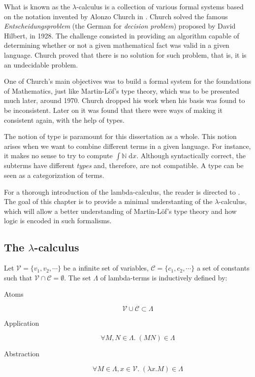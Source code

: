 What is known as the $\lambda$-calculus is a collection of various formal systems based 
on the notation invented by Alonzo Church in \cite{Church01,Church02}. 
Church solved the famous \textit{Entscheidungsproblem} (the German for \textit{decision problem}) 
proposed by David Hilbert, in 1928. The challenge consisted in providing an algorithm capable
of determining whether or not a given mathematical fact was valid in a given language. 
Church proved that there is no solution for such problem, that is, it is an undecidable problem.

One of Church's main objectives was to build a formal system for the foundations of
Mathematics, just like Martin-Löf's type theory, which was to be presented much later, around 1970. 
Church dropped his work when his basis was found to be inconsistent. Later on it was found
that there were ways of making it consistent again, with the help of types.

The notion of type is paramount for this dissertation as a whole. This notion arises when we want 
to combine different terms in a given language. For instance, it makes no sense to try
to compute $\int \mathbb{N}\;\mathrm{d}x$. Although syntactically correct, the subterms have
different \emph{types} and, therefore, are not compatible. A type can be seen as a
categorization of terms.

For a thorough introduction of the lambda-calculus, the reader is directed to \cite{Barendregt01,Hindley01}.
The goal of this chapter is to provide a minimal understanting of the $\lambda$-calculus, which
will allow a better understanding of Martin-L\"{o}f's type theory and how logic is encoded
in such formalisms.

\subsection{The $\lambda$-calculus}

\begin{mydef} Let $\mathcal{V} = \{v_1, v_2, \cdots\}$ be a infinite set of
variables, $\mathcal{C}=\{c_1, c_2, \cdots\}$ a set of constants such that 
$\mathcal{V} \cap \mathcal{C} = \emptyset$. The set $\Lambda$ of lambda-terms is 
inductively defined by:
\begin{description}
  \item[Atoms]
        \[ \mathcal{V} \cup \mathcal{C} \subset \Lambda \]
  \item[Application]  
        \[ \forall M, N \in \Lambda.\; (M N) \in \Lambda \]
  \item[Abstraction]
        \[ \forall M \in \Lambda, x \in \mathcal{V}.\; (\lambda x . M) \in \Lambda \]
\end{description}
\end{mydef}

